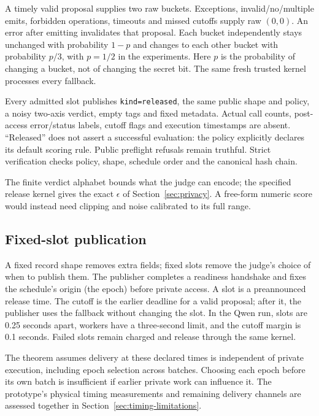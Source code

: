 \documentclass[10pt,twocolumn]{article}
\begin{document}
A timely valid proposal supplies two raw buckets. Exceptions, invalid/no/multiple emits, forbidden operations, timeouts and missed cutoffs supply raw $(0,0)$. An error after emitting invalidates that proposal. Each bucket independently stays unchanged with probability $1-p$ and changes to each other bucket with probability $p/3$, with $p=1/2$ in the experiments. Here $p$ is the probability of changing a bucket, not of changing the secret bit. The same fresh trusted kernel processes every fallback.

Every admitted slot publishes \texttt{kind=released}, the same public shape and policy, a noisy two-axis verdict, empty tags and fixed metadata. Actual call counts, post-access error/status labels, cutoff flags and execution timestamps are absent. ``Released'' does not assert a successful evaluation: the policy explicitly declares its default scoring rule. Public preflight refusals remain truthful. Strict verification checks policy, shape, schedule order and the canonical hash chain.

The finite verdict alphabet bounds what the judge can encode; the specified release kernel gives the exact $\epsilon$ of Section~\ref{sec:privacy}. A free-form numeric score would instead need clipping and noise calibrated to its full range.

\subsection{Fixed-slot publication}
A fixed record shape removes extra fields; fixed slots remove the judge's choice of when to publish them. The publisher completes a readiness handshake and fixes the schedule's origin (the epoch) before private access. A slot is a preannounced release time. The cutoff is the earlier deadline for a valid proposal; after it, the publisher uses the fallback without changing the slot. In the Qwen run, slots are 0.25 seconds apart, workers have a three-second limit, and the cutoff margin is 0.1 seconds. Failed slots remain charged and release through the same kernel.

The theorem assumes delivery at these declared times is independent of private execution, including epoch selection across batches. Choosing each epoch before its own batch is insufficient if earlier private work can influence it. The prototype's physical timing measurements and remaining delivery channels are assessed together in Section~\ref{sec:timing-limitations}.
\end{document}
